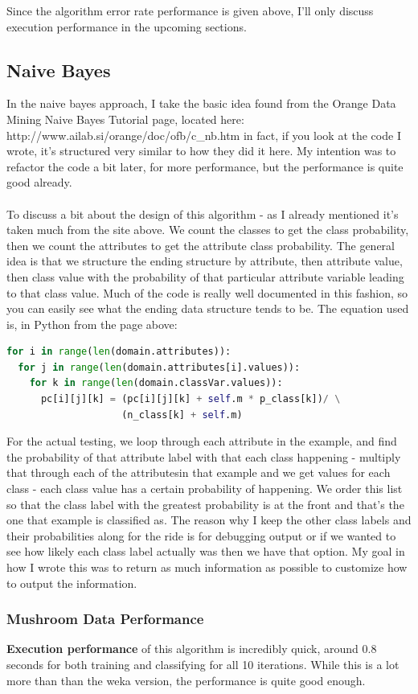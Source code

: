 \documentclass{article}
\begin{document}
Since the algorithm error rate performance is given above, I'll only discuss execution performance in the upcoming sections.

\subsection{Naive Bayes}
In the naive bayes approach, I take the basic idea found from the Orange Data Mining Naive Bayes Tutorial page, located here: http://www.ailab.si/orange/doc/ofb/c\_nb.htm in fact, if you look at the code I wrote, it's structured very similar to how they did it here.  My intention was to refactor the code a bit later, for more performance, but the performance is quite good already.\\
\\
To discuss a bit about the design of this algorithm - as I already mentioned it's taken much from the site above.  We count the classes to get the class probability, then we count the attributes to get the attribute class probability.  The general idea is that we structure the ending structure by attribute, then attribute value, then class value with the probability of that particular attribute variable leading to that class value.  Much of the code is really well documented in this fashion, so you can easily see what the ending data structure tends to be.  The equation used is, in Python from the page above:
\begin{lstlisting}[frame=single,language=python]
for i in range(len(domain.attributes)):
  for j in range(len(domain.attributes[i].values)): 
    for k in range(len(domain.classVar.values)):
      pc[i][j][k] = (pc[i][j][k] + self.m * p_class[k])/ \
                    (n_class[k] + self.m)
\end{lstlisting}
For the actual testing, we loop through each attribute in the example, and find the probability of that attribute label with that each class happening - multiply that through each of the attributesin that example and we get values for each class - each class value has a certain probability of happening.  We order this list so that the class label with the greatest probability is at the front and that's the one that example is classified as.  The reason why I keep the other class labels and their probabilities along for the ride is for debugging output or if we wanted to see how likely each class label actually was then we have that option.  My goal in how I wrote this was to return as much information as possible to customize how to output the information.
\subsubsection{Mushroom Data Performance}
\textbf{Execution performance} of this algorithm is incredibly quick, around 0.8 seconds for both training and classifying for all 10 iterations.  While this is a lot more than than the weka version, the performance is quite good enough.\\
\end{document}
